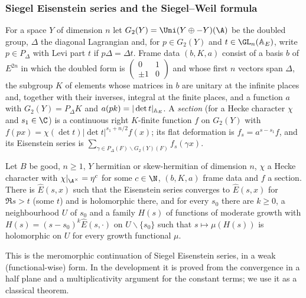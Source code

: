 \subsubsection{Siegel Eisenstein series and the Siegel--Weil formula}\label{sec:pf:thmK:sw}
For a space $Y$ of dimension $n$ let $G_2(Y)=\Uni(Y\oplus-Y)(\A)$ be the doubled group, $\Delta$ the diagonal Lagrangian
and, for $p\in G_2(Y)$ and $t\in\GL_n(\thmKAE)$, write $p\in P_\Delta$ with Levi part $t$ if $p\Delta=\Delta t$. Frame
data $(b,K,a)$ consist of a basis $b$ of $E^{2n}$ in which the doubled form is $\left(\begin{smallmatrix}0&1\\
\pm1&0\end{smallmatrix}\right)$ and whose first $n$ vectors span $\Delta$, the subgroup $K$ of elements whose matrices
in $b$ are unitary at the infinite places and, together with their inverses, integral at the finite places, and a
function $a$ with $G_2(Y)=P_\Delta K$ and $a(pk)=|\det t|_{\mathbb{A}_E}$. A \emph{section} (for a Hecke character $\chi$ and
$s_1\in\C$) is a continuous right $K$-finite function $f$ on $G_2(Y)$ with $f(px)=\chi(\det t)|\det t|^{s_1+n/2}f(x)$;
its flat deformation is $f_s=a^{s-s_1}f$, and its Eisenstein series is $\sum_{\gamma\in P_\Delta(F)\backslash
G_2(Y)(F)}f_s(\gamma x)$.

\begin{littheorem}\label{pf:thmK:eis}
Let $B$ be good, $n\ge1$, $Y$ hermitian or skew-hermitian of dimension $n$, $\chi$ a Hecke character with
$\chi|_{\A^\times}=\eta^{c}$ for some $c\in\N$, $(b,K,a)$ frame data and $f$ a section. There is $\hat E(s,x)$ such that the Eisenstein
series converges to $\hat E(s,x)$ for $\Re s>t$ (some $t$) and is holomorphic there, and for every $s_0$ there are $k\ge0$,
a neighbourhood $U$ of $s_0$ and a family $H(s)$ of functions of moderate growth with $H(s)=(s-s_0)^k\hat E(s,\cdot)$ on
$U\smallsetminus\{s_0\}$ such that $s\mapsto\mu(H(s))$ is holomorphic on $U$ for every growth functional $\mu$.
\end{littheorem}

This is the meromorphic continuation of Siegel Eisenstein series, in a weak (functional-wise) form. In the development it
is proved from the convergence in a half plane and a multiplicativity argument for the constant terms; we use it as a
classical theorem.

